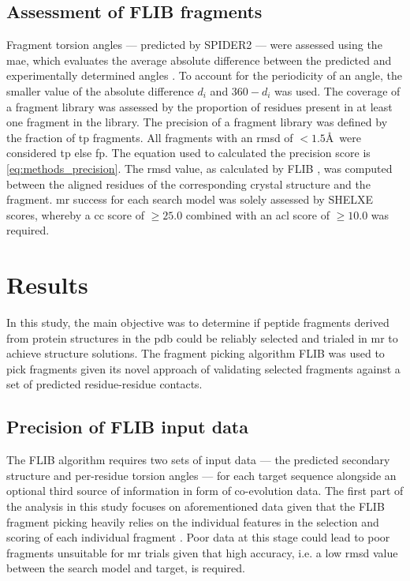 \subsection{Assessment of FLIB fragments}
Fragment torsion angles --- predicted by SPIDER2 \cite{Heffernan2015-wp} --- were assessed using the \gls{mae}, which evaluates the average absolute difference between the predicted and experimentally determined angles \cite{Heffernan2015-wp}. To account for the periodicity of an angle, the smaller value of the absolute difference $d_i$ and $360-d_i$ was used. The coverage of a fragment library was assessed by the proportion of residues present in at least one fragment in the library. The precision of a fragment library was defined by the fraction of \gls{tp} fragments. All fragments with an \gls{rmsd} of $<1.5$\AA\ were considered \gls{tp} else \gls{fp}. The equation used to calculated the precision score is \cref{eq:methods_precision}. The \gls{rmsd} value, as calculated by FLIB \cite{De_Oliveira2015-ba}, was computed between the aligned residues of the corresponding crystal structure and the fragment. \Gls{mr} success for each search model was solely assessed by SHELXE scores, whereby a \gls{cc} score of $\geq25.0$ combined with an \gls{acl} score of $\geq10.0$ was required.

\section{Results}
In this study, the main objective was to determine if peptide fragments derived from protein structures in the \gls{pdb} could be reliably selected and trialed in \gls{mr} to achieve structure solutions. The fragment picking algorithm FLIB \cite{De_Oliveira2015-ba} was used to pick fragments given its novel approach of validating selected fragments against a set of predicted residue-residue contacts.

\subsection{Precision of FLIB input data}
The FLIB algorithm requires two sets of input data --- the predicted secondary structure and per-residue torsion angles --- for each target sequence alongside an optional third source of information in form of co-evolution data. The first part of the analysis in this study focuses on aforementioned data given that the FLIB fragment picking heavily relies on the individual features in the selection and scoring of each individual fragment \cite{De_Oliveira2015-ba}. Poor data at this stage could lead to poor fragments unsuitable for \gls{mr} trials given that high accuracy, i.e. a low \gls{rmsd} value between the search model and target, is required.

